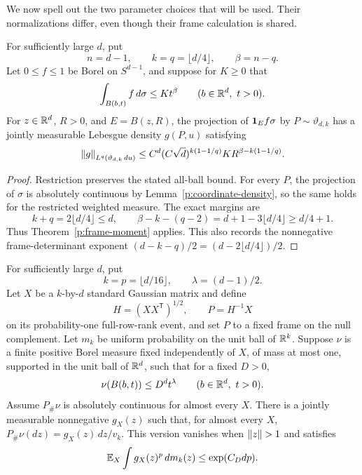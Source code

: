 We now spell out the two parameter choices that will be used. Their
normalizations differ, even though their frame calculation is shared.

\begin{corollary}
\label{p:frame-n30}
For sufficiently large \(d\), put
\[
 n=d-1,\qquad k=q=\lfloor d/4\rfloor,\qquad \beta=n-q.
\]
Let \(0\le f\le1\) be Borel on \(S^{d-1}\), and suppose for \(K\ge0\) that
\[
 \int_{B(b,t)}f\,d\sigma\le Kt^\beta
 \qquad(b\in\mathbb R^d,\ t>0).
\]
For \(z\in\mathbb R^d\), \(R>0\), and \(E=B(z,R)\), the projection of \(\mathbf 1_E f\sigma\) by
\(P\sim\vartheta_{d,k}\) has a jointly measurable Lebesgue density
\(g(P,u)\) satisfying
\begin{equation}\label{p:frame-n30-bound}
 \left\lVert g\right\rVert_{L^q(\vartheta_{d,k}\,du)}
 \le C^d(C\sqrt d)^{k(1-1/q)}
 K R^{\beta-k(1-1/q)}.
\end{equation}
\end{corollary}

\begin{proof}
Restriction preserves the stated all-ball bound. For every \(P\), the
projection of \(\sigma\) is absolutely continuous by
Lemma~\ref{p:coordinate-density}, so the same holds for the restricted
weighted measure. The exact margins are
\[
 k+q=2\lfloor d/4\rfloor\le d,\qquad
 \beta-k-(q-2)=d+1-3\lfloor d/4\rfloor\ge d/4+1.
\]
Thus Theorem~\ref{p:frame-moment} applies. This also records the
nonnegative frame-determinant exponent
\((d-k-q)/2=(d-2\lfloor d/4\rfloor)/2\).
\end{proof}

\begin{theorem}
\label{p:frame-positive}
For sufficiently large \(d\), put
\[
 k=p=\lfloor d/16\rfloor,\qquad \lambda=(d-1)/2.
\]
Let \(X\) be a \(k\)-by-\(d\) standard Gaussian matrix and define
\[
 H=(XX^{\mathsf T})^{1/2},\qquad P=H^{-1}X
\]
on its probability-one full-row-rank event, and set \(P\) to a fixed frame
on the null complement. Let \(m_k\) be uniform
probability on the unit ball of \(\mathbb R^k\). Suppose \(\nu\) is a finite
positive Borel measure fixed independently of \(X\), of mass at most one, supported in the unit ball
of \(\mathbb R^d\), such that for a fixed \(D>0\),
\[
 \nu(B(b,t))\le D^d t^\lambda
 \qquad(b\in\mathbb R^d,\ t>0).
\]
Assume \(P_\#\nu\) is absolutely continuous for almost every \(X\).
There is a jointly measurable nonnegative \(g_X(z)\) such that, for almost
every \(X\), \(P_\#\nu(dz)=g_X(z)\,dz/v_k\). This version vanishes when
\(\left\lVert z\right\rVert>1\) and satisfies
\begin{equation}\label{p:frame-positive-bound}
 \mathbb E_X\int g_X(z)^p\,dm_k(z)\le \exp(C_Ddp).
\end{equation}
\end{theorem}

